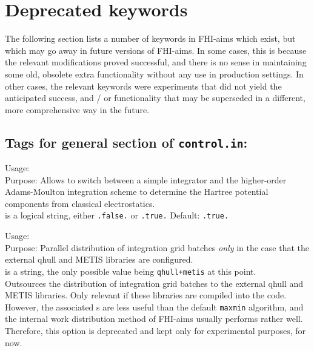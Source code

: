 \section{Deprecated keywords}

The following section lists a number of keywords in FHI-aims which
exist, but which may go away in future versions of FHI-aims. In some
cases, this is because the relevant modifications proved successful,
and there is no sense in maintaining some old, obsolete extra
functionality without any use in production settings. In other cases,
the relevant keywords were experiments that did not yield the
anticipated success, and / or functionality that may be superseded in
a different, more comprehensive way in the future.

\newpage

\subsection*{Tags for general section of \texttt{control.in}:}

{
  \noindent
  Usage:   \\[1.0ex]
  Purpose: Allows to switch between a simple integrator and the
    higher-order Adams-Moulton integration scheme to determine the
    Hartree potential components from classical
    electrostatics. \\[1.0ex] 
   is a logical string, either \texttt{.false.} or
    \texttt{.true.} Default: \texttt{.true.} \\
}

{
  \noindent
  Usage:   \\[1.0ex]
  Purpose: Parallel distribution of integration grid batches
    \emph{only} in the case that the external qhull and METIS
    libraries are configured. \\[1.0ex]
   is a string, the only possible value being
    \texttt{qhull+metis} at this point. \\
}
Outsources the distribution of integration grid batches to the
external qhull and METIS libraries. Only relevant if these libraries
are compiled into the code. However, the associated
s are less useful than the
default \texttt{maxmin} algorithm, and the internal work distribution
method of FHI-aims usually performs rather well. Therefore, this
option is deprecated and kept only for experimental purposes, for
now. 


